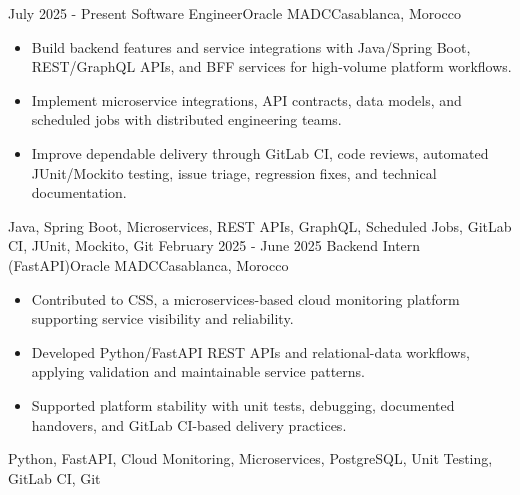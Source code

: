 
\begin{experiences}
  \experience
    {July 2025 - Present}
    {Software Engineer}{Oracle MADC}{Casablanca, Morocco}
    {} {
      \begin{itemize}
        \item Build backend features and service integrations with Java/Spring Boot, REST/GraphQL APIs, and BFF services for high-volume platform workflows.
        \item Implement microservice integrations, API contracts, data models, and scheduled jobs with distributed engineering teams.
        \item Improve dependable delivery through GitLab CI, code reviews, automated JUnit/Mockito testing, issue triage, regression fixes, and technical documentation.
      \end{itemize}
    }
    {Java, Spring Boot, Microservices, REST APIs, GraphQL, Scheduled Jobs, GitLab CI, JUnit, Mockito, Git}
  \experience
    {February 2025 - June 2025}
    {Backend Intern (FastAPI)}{Oracle MADC}{Casablanca, Morocco}
    {} {
      \begin{itemize}
        \item Contributed to CSS, a microservices-based cloud monitoring platform supporting service visibility and reliability.
        \item Developed Python/FastAPI REST APIs and relational-data workflows, applying validation and maintainable service patterns.
        \item Supported platform stability with unit tests, debugging, documented handovers, and GitLab CI-based delivery practices.
      \end{itemize}
    }
    {Python, FastAPI, Cloud Monitoring, Microservices, PostgreSQL, Unit Testing, GitLab CI, Git}
  \emptySeparator
\end{experiences}
